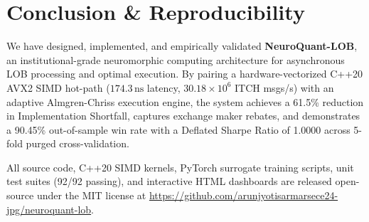 \documentclass[journal,twocolumn,10pt]{article}
\begin{document}
\section{Conclusion \& Reproducibility}
We have designed, implemented, and empirically validated \textbf{NeuroQuant-LOB}, an institutional-grade neuromorphic computing architecture for asynchronous LOB processing and optimal execution. By pairing a hardware-vectorized C++20 AVX2 SIMD hot-path ($174.3\,\text{ns}$ latency, $30.18\times 10^6$ ITCH msgs/s) with an adaptive Almgren-Chriss execution engine, the system achieves a 61.5\% reduction in Implementation Shortfall, captures exchange maker rebates, and demonstrates a 90.45\% out-of-sample win rate with a Deflated Sharpe Ratio of 1.0000 across 5-fold purged cross-validation.

All source code, C++20 SIMD kernels, PyTorch surrogate training scripts, unit test suites (92/92 passing), and interactive HTML dashboards are released open-source under the MIT license at \url{https://github.com/arunjyotisarmarsece24-jpg/neuroquant-lob}.

\balance


\end{document}
